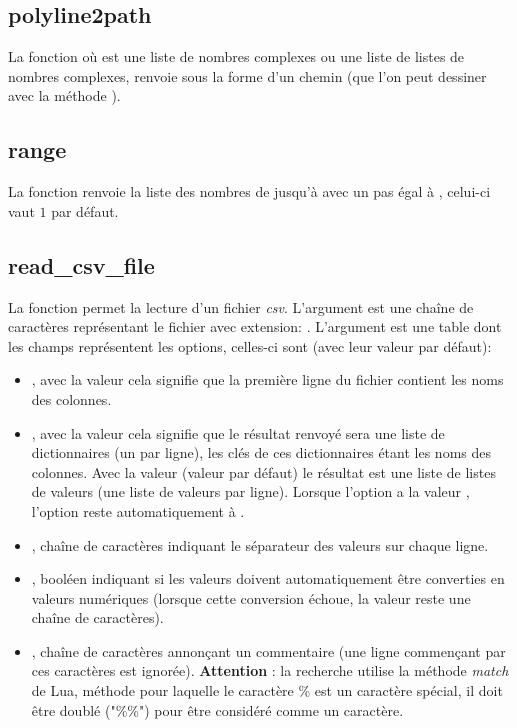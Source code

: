 \subsection{polyline2path}
La fonction  où  est une liste de nombres complexes ou une liste de listes de nombres complexes, renvoie  sous la forme d'un chemin (que l'on peut dessiner avec la méthode ).

\subsection{range}
La fonction  renvoie la liste des nombres de  jusqu'à  avec un pas égal à , celui-ci vaut $1$ par défaut.

\subsection{read\_csv\_file}
La fonction  permet la lecture d'un fichier \emph{csv}. L'argument  est une chaîne de caractères représentant le fichier avec extension: . L'argument  est une table dont les champs représentent les options, celles-ci sont (avec leur valeur par défaut):
\begin{itemize}
    \item {}, avec la valeur \true cela signifie que la première ligne du fichier contient les noms des colonnes.
    
    \item {}, avec la valeur \true cela signifie que le résultat renvoyé sera une liste de dictionnaires (un par ligne), les clés de ces dictionnaires étant les noms des colonnes. Avec la valeur \false (valeur par défaut) le résultat est une liste de listes de valeurs (une liste de valeurs par ligne). Lorsque l'option  a la valeur \false, l'option  reste automatiquement à \false.
    
    \item {}, chaîne de caractères indiquant le séparateur des valeurs sur chaque ligne.
    
    \item {}, booléen indiquant si les valeurs doivent automatiquement être converties en valeurs numériques (lorsque cette conversion échoue, la valeur reste une chaîne de caractères).
    
    \item {}, chaîne de caractères annonçant un commentaire (une ligne commençant par ces caractères est ignorée). \textbf{Attention} : la recherche utilise la méthode \emph{match} de Lua, méthode pour laquelle le caractère \% est un caractère spécial, il doit être doublé ("\%\%") pour être considéré comme un caractère.
\end{itemize}
